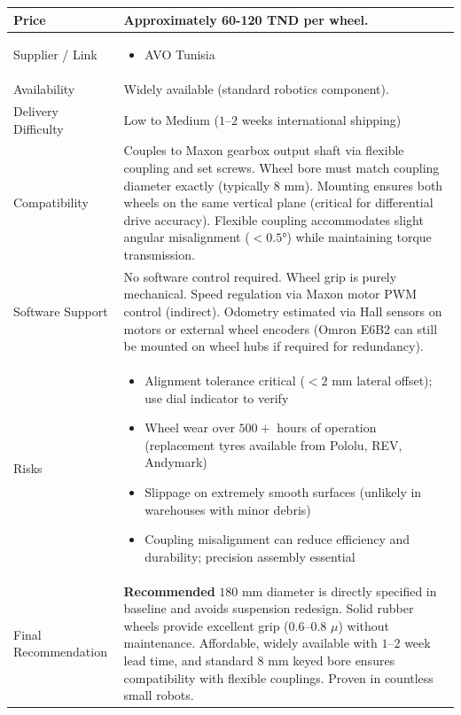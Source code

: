 \documentclass[12pt,a4paper]{article}
\begin{document}
\begin{longtable}{|p{4cm}|p{10cm}|}
Price &
Approximately 60-120 TND per wheel. \\
\hline

Supplier / Link &
\begin{itemize}
\item AVO Tunisia
\end{itemize}
\\
\hline

Availability &
Widely available (standard robotics component). \\
\hline

Delivery Difficulty &
Low to Medium ($1$--$2$ weeks international shipping) \\
\hline

Compatibility &
Couples to Maxon gearbox output shaft via flexible coupling and set screws. Wheel bore must match coupling diameter exactly (typically $8$ mm). Mounting ensures both wheels on the same vertical plane (critical for differential drive accuracy). Flexible coupling accommodates slight angular misalignment ($<0.5°$) while maintaining torque transmission. \\
\hline

Software Support &
No software control required. Wheel grip is purely mechanical. Speed regulation via Maxon motor PWM control (indirect). Odometry estimated via Hall sensors on motors or external wheel encoders (Omron E6B2 can still be mounted on wheel hubs if required for redundancy). \\
\hline

Risks &
\begin{itemize}
\item Alignment tolerance critical ($<2$ mm lateral offset); use dial indicator to verify
\item Wheel wear over $500+$ hours of operation (replacement tyres available from Pololu, REV, Andymark)
\item Slippage on extremely smooth surfaces (unlikely in warehouses with minor debris)
\item Coupling misalignment can reduce efficiency and durability; precision assembly essential
\end{itemize}
\\
\hline

Final Recommendation &
\textbf{Recommended}  $180$ mm diameter is directly specified in baseline and avoids suspension redesign. Solid rubber wheels provide excellent grip ($0.6$--$0.8$ $\mu$) without maintenance. Affordable, widely available with $1$--$2$ week lead time, and standard $8$ mm keyed bore ensures compatibility with flexible couplings. Proven in countless small robots. \\
\hline

\end{longtable}
\end{document}
